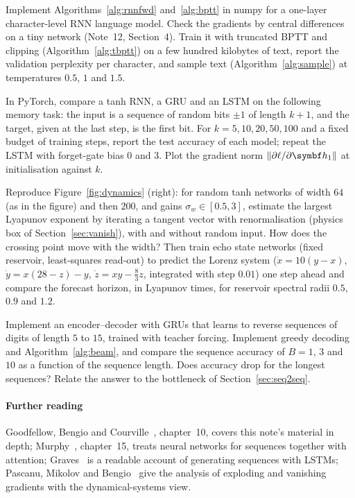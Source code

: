 \documentclass[11pt]{article}
\newcommand{\hv}{\vect{h}}
\begin{document}
\begin{questions}
\begin{programming}
\item Implement Algorithms~\ref{alg:rnnfwd} and~\ref{alg:bptt} in numpy for a one-layer character-level RNN language model.
  Check the gradients by central differences on a tiny network (Note~12, Section~4). Train it with truncated BPTT and
  clipping (Algorithm~\ref{alg:tbptt}) on a few hundred kilobytes of text, report the validation perplexity per character,
  and sample text (Algorithm~\ref{alg:sample}) at temperatures $0.5$, $1$ and $1.5$.
\item In PyTorch, compare a tanh RNN, a GRU and an LSTM on the following memory task: the input is a sequence of random bits
  $\pm 1$ of length $k + 1$, and the target, given at the last step, is the first bit. For $k = 5, 10, 20, 50, 100$ and a fixed
  budget of training steps, report the test accuracy of each model; repeat the LSTM with forget-gate bias $0$ and $3$.
  Plot the gradient norm $\norm{\partial\ell/\partial\hv_1}$ at initialisation against $k$.
\item Reproduce Figure~\ref{fig:dynamics} (right): for random tanh networks of width $64$ (as in the figure) and then $200$,
  and gains $\sigma_w \in [0.5, 3]$, estimate the largest Lyapunov exponent by iterating a tangent vector with renormalisation
  (physics box of Section~\ref{sec:vanish}), with and without random input. How does the crossing point move with the
  width? Then train echo state networks (fixed reservoir, least-squares read-out) to predict the Lorenz system
  ($\dot x = 10(y - x)$, $\dot y = x(28 - z) - y$, $\dot z = xy - \frac83 z$, integrated with step $0.01$) one step ahead and
  compare the forecast horizon, in Lyapunov times, for reservoir spectral radii $0.5$, $0.9$ and $1.2$.
\item Implement an encoder--decoder with GRUs that learns to reverse sequences of digits of length $5$ to $15$, trained with
  teacher forcing. Implement greedy decoding and Algorithm~\ref{alg:beam}, and compare the sequence accuracy of $B = 1$,
  $3$ and $10$ as a function of the sequence length. Does accuracy drop for the longest sequences? Relate the answer to the
  bottleneck of Section~\ref{sec:seq2seq}.
\end{programming}
\end{questions}

\paragraph{Further reading} Goodfellow, Bengio and Courville~\cite{goodfellow2016}, chapter~10, covers this note's material
in depth; Murphy~\cite{murphy2022}, chapter~15, treats neural networks for sequences together with attention; Graves~\cite{graves2013}
is a readable account of generating sequences with LSTMs; Pascanu, Mikolov and Bengio~\cite{pascanu2013} give the analysis of
exploding and vanishing gradients with the dynamical-systems view.
\end{document}
